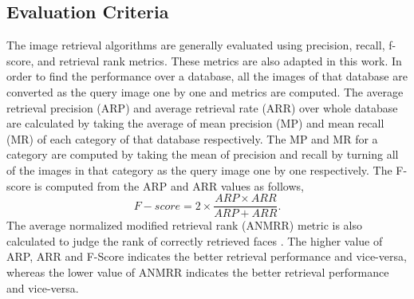 \documentclass[a4paper]{article}
\begin{document}
\subsection{Evaluation Criteria}
The image retrieval algorithms are generally evaluated using precision, recall, f-score, and retrieval rank metrics. These metrics are also adapted in this work. In order to find the performance over a database, all the images of that database are converted as the query image one by one and metrics are computed. The average retrieval precision (ARP) and average retrieval rate (ARR) over whole database are calculated by taking the average of mean precision (MP) and mean recall (MR) of each category of that database respectively. The MP and MR for a category are computed by taking the mean of precision and recall by turning all of the images in that category as the query image one by one respectively. The F-score is computed from the ARP and ARR values as follows,
$$F-score=2 \times \frac{ARP\times ARR}{ARP+ARR}.$$
The average normalized modified retrieval rank (ANMRR) metric is also calculated to judge the rank of correctly retrieved faces \cite{anmrr}. The higher value of ARP, ARR and F-Score indicates the better retrieval performance and vice-versa, whereas the lower value of ANMRR indicates the better retrieval performance and vice-versa.
\end{document}
